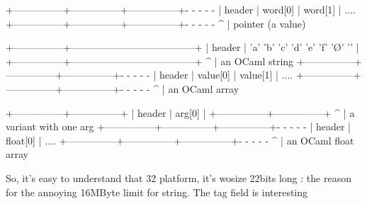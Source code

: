 \begin{bluetext}
+---------------+---------------+---------------+- - - - -
| header        | word[0]       | word[1]       | ....
+---------------+---------------+---------------+- - - - -
                                ^
                                |
                    pointer (a value)


+---------------+--------------------------------------+
| header        | 'a' 'b' 'c' 'd' 'e' 'f' '\O' '\1'    |
+---------------+--------------------------------------+
                ^
                |
           an OCaml string
+---------------+---------------+---------------+- - - - -
| header        | value[0]      | value[1]      | ....
+---------------+---------------+---------------+- - - - -
                ^
                |
          an OCaml array

+---------------+---------------+
| header        | arg[0]        |
+---------------+---------------+
                ^
                |
        a variant with one arg
+---------------+---------------+---------------+- - - - -
| header        | float[0]      | ....
+---------------+---------------+---------------+- - - - -
                ^
                |
       an OCaml float array
\end{bluetext}
So, it's easy to understand that 32 platform, it's wosize 22bits long
: the reason for the annoying 16MByte limit for string. The tag field is
interesting


